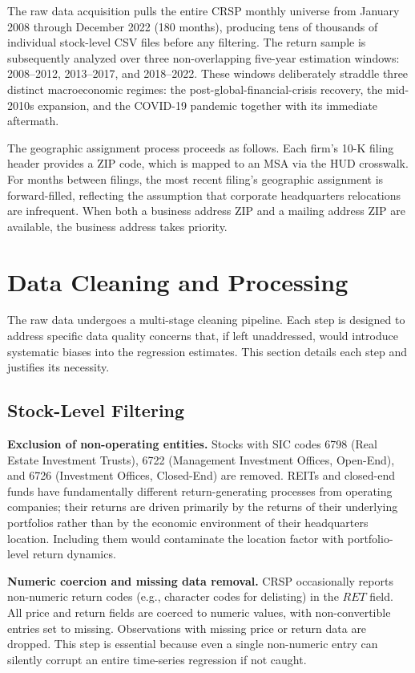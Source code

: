 \documentclass[
  12pt,
]{article}
\begin{document}
The raw data acquisition pulls the entire CRSP monthly universe from
January 2008 through December 2022 (180 months), producing tens of
thousands of individual stock-level CSV files before any filtering. The
return sample is subsequently analyzed over three non-overlapping
five-year estimation windows: 2008--2012, 2013--2017, and 2018--2022.
These windows deliberately straddle three distinct macroeconomic
regimes: the post-global-financial-crisis recovery, the mid-2010s
expansion, and the COVID-19 pandemic together with its immediate
aftermath.

The geographic assignment process proceeds as follows. Each firm's 10-K
filing header provides a ZIP code, which is mapped to an MSA via the HUD
crosswalk. For months between filings, the most recent filing's
geographic assignment is forward-filled, reflecting the assumption that
corporate headquarters relocations are infrequent. When both a business
address ZIP and a mailing address ZIP are available, the business
address takes priority.

\section{Data Cleaning and
Processing}\label{data-cleaning-and-processing}

The raw data undergoes a multi-stage cleaning pipeline. Each step is
designed to address specific data quality concerns that, if left
unaddressed, would introduce systematic biases into the regression
estimates. This section details each step and justifies its necessity.

\subsection{Stock-Level Filtering}\label{stock-level-filtering}

\textbf{Exclusion of non-operating entities.} Stocks with SIC codes 6798
(Real Estate Investment Trusts), 6722 (Management Investment Offices,
Open-End), and 6726 (Investment Offices, Closed-End) are removed. REITs
and closed-end funds have fundamentally different return-generating
processes from operating companies; their returns are driven primarily
by the returns of their underlying portfolios rather than by the
economic environment of their headquarters location. Including them
would contaminate the location factor with portfolio-level return
dynamics.

\textbf{Numeric coercion and missing data removal.} CRSP occasionally
reports non-numeric return codes (e.g., character codes for delisting)
in the \(RET\) field. All price and return fields are coerced to numeric
values, with non-convertible entries set to missing. Observations with
missing price or return data are dropped. This step is essential because
even a single non-numeric entry can silently corrupt an entire
time-series regression if not caught.
\end{document}
